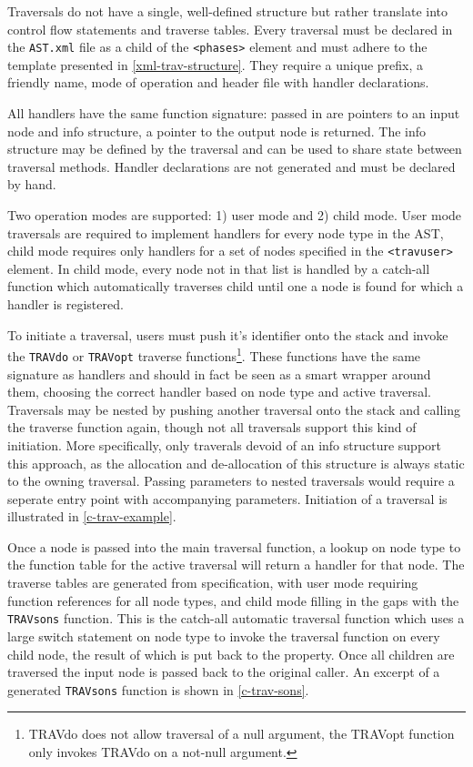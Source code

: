 \documentclass[twoside,openright]{uva-bachelor-thesis}
\newcommand{\code}[1]{\texttt{\footnotesize#1}}
\begin{document}
			Traversals do not have a single, well-defined structure but rather translate into control flow statements and traverse tables. Every traversal must be declared in the \code{AST.xml} file as a child of the \code{<phases>} element and must adhere to the template presented in \cref{xml-trav-structure}. They require a unique prefix, a friendly name, mode of operation and header file with handler declarations.
			
			All handlers have the same function signature: passed in are pointers to an input node and info structure, a pointer to the output node is returned. The info structure may be defined by the traversal and can be used to share state between traversal methods. Handler declarations are not generated and must be declared by hand.
			
			Two operation modes are supported: 1) user mode and 2) child mode. User mode traversals are required to implement handlers for every node type in the AST, child mode requires only handlers for a set of nodes specified in the \code{<travuser>} element. In child mode, every node not in that list is handled by a catch-all function which automatically traverses child until one a node is found for which a handler is registered.
			
			To initiate a traversal, users must push it's identifier onto the stack and invoke the \code{TRAVdo} or \code{TRAVopt} traverse functions\footnote{TRAVdo does not allow traversal of a null argument, the TRAVopt function only invokes TRAVdo on a not-null argument.}. These functions have the same signature as handlers and should in fact be seen as a smart wrapper around them, choosing the correct handler based on node type and active traversal. Traversals may be nested by pushing another traversal onto the stack and calling the traverse function again, though not all traversals support this kind of initiation. More specifically, only traverals devoid of an info structure support this approach, as the allocation and de-allocation of this structure is always static to the owning traversal. Passing parameters to nested traversals would require a seperate entry point with accompanying parameters. Initiation of a traversal is illustrated in \cref{c-trav-example}.
			
			Once a node is passed into the main traversal function, a lookup on node type to the function table for the active traversal will return a handler for that node. The traverse tables are generated from specification, with user mode requiring function references for all node types, and child mode filling in the gaps with the \code{TRAVsons} function. This is the catch-all automatic traversal function which uses a large switch statement on node type to invoke the traversal function on every child node, the result of which is put back to the property. Once all children are traversed the input node is passed back to the original caller. An excerpt of a generated \code{TRAVsons} function is shown in \cref{c-trav-sons}. 
			
\end{document}
